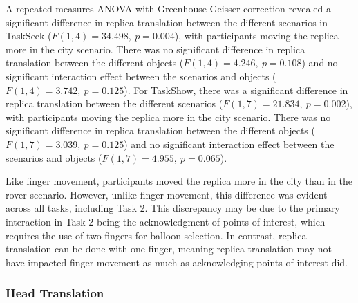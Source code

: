            A repeated measures ANOVA with Greenhouse-Geisser correction revealed a significant difference in replica translation between the different scenarios in TaskSeek ($F(1, 4) = 34.498,\ p = 0.004$), with participants moving the replica more in the city scenario. There was no significant difference in replica translation between the different objects ($F(1, 4) = 4.246,\ p = 0.108$) and no significant interaction effect between the scenarios and objects ($F(1, 4) = 3.742,\ p = 0.125$). For TaskShow, there was a significant difference in replica translation between the different scenarios ($F(1, 7) = 21.834,\ p = 0.002$), with participants moving the replica more in the city scenario. There was no significant difference in replica translation between the different objects ($F(1, 7) = 3.039,\ p = 0.125$) and no significant interaction effect between the scenarios and objects ($F(1, 7) = 4.955,\ p = 0.065$).

            Like finger movement, participants moved the replica more in the city than in the rover scenario. However, unlike finger movement, this difference was evident across all tasks, including Task 2. This discrepancy may be due to the primary interaction in Task 2 being the acknowledgment of points of interest, which requires the use of two fingers for balloon selection. In contrast, replica translation can be done with one finger, meaning replica translation may not have impacted finger movement as much as acknowledging points of interest did.

        \subsubsection{Head Translation}


